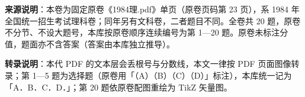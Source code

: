 

\begin{gktip}
\textbf{来源说明}：本卷为固定原卷《1984理.pdf》单页（原卷页码第 23 页），系 1984 年全国统一招生考试理科卷；同年另有文科卷，二者题目不同。全卷共 20 题，原卷不分节、不设大题号，本库按原卷顺序连续编号为第 1—20 题。原卷未标注分值，题面亦不含答案（答案由本库独立推导）。

\textbf{转录说明}：本代 PDF 的文本层会丢根号与分数线，本文一律按 PDF 页面图像转录；第 1—5 题为选择题（原卷用「（A）（B）（C）（D）」标注），本库统一记为「A．B．C．D．」；第 20 题依原卷配图重绘为 TikZ 矢量图。
\end{gktip}

